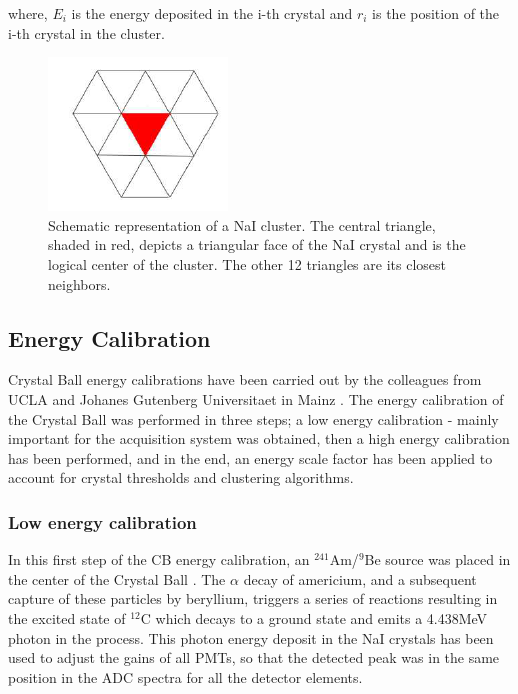 where, $E_{i}$ is the energy deposited in the i-th crystal and $r_{i}$ is the position of the i-th crystal in the cluster.

\begin{figure}[H]
\begin{center}
\includegraphics[scale=0.55]{pictures/png/cbcluster.png}
\caption{Schematic representation of a NaI cluster. The central triangle, shaded in red, depicts a triangular face of the NaI crystal and is the logical center of the cluster. The other 12 triangles are its closest neighbors.}
\label{cbcluster}
\end{center}
\end{figure}

\subsection{Energy Calibration}

\indent Crystal Ball energy calibrations have been carried out by the colleagues from UCLA and Johanes Gutenberg Universitaet in Mainz \cite{marc}. The energy calibration of the Crystal Ball was performed in three steps; a low energy calibration - mainly important for the acquisition system was obtained, then a high energy calibration has been performed, and in the end, an energy scale factor has been applied to account for crystal thresholds and clustering algorithms.

\subsubsection{Low energy calibration}

\indent In this first step of the CB energy calibration, an $^{241}$Am/$^{9}$Be source was placed in the center of the Crystal Ball \cite{marc}. The $\alpha$ decay of americium, and a subsequent capture of these particles by beryllium, triggers a series of reactions resulting in the excited state of $^{12}$C which decays to a ground state and emits a 4.438MeV photon in the process. This photon energy deposit in the NaI crystals has been used to adjust the gains of all PMTs, so that the detected peak was in the same position in the ADC spectra for all the detector elements.

